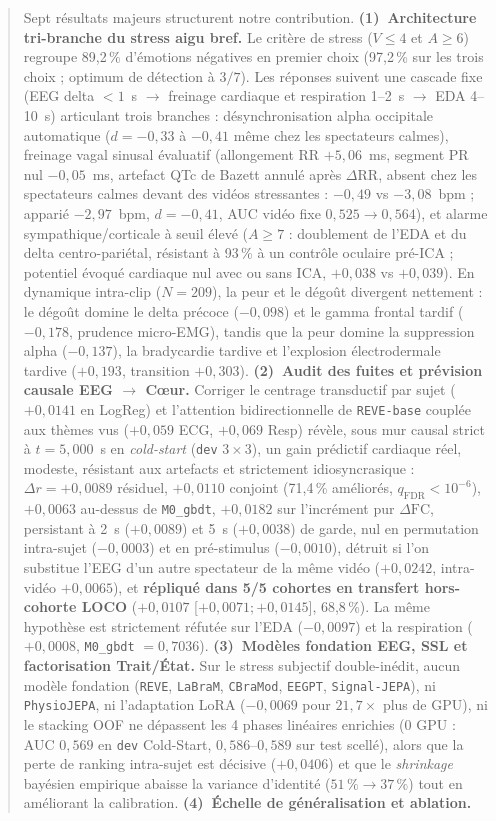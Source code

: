\documentclass[10pt]{article}
\begin{document}
\begin{abstract}
Sept résultats majeurs structurent notre contribution. \textbf{(1)~Architecture tri-branche du stress aigu bref.} Le critère de stress ($V \le 4$ et $A \ge 6$) regroupe 89,2\,\% d'émotions négatives en premier choix (97,2\,\% sur les trois choix ; optimum de détection à $3/7$). Les réponses suivent une cascade fixe (EEG delta $<1$~s $\to$ freinage cardiaque et respiration 1--2~s $\to$ EDA 4--10~s) articulant trois branches : désynchronisation alpha occipitale automatique ($d = -0{,}33$ à $-0{,}41$ même chez les spectateurs calmes), freinage vagal sinusal évaluatif (allongement RR $+5{,}06$~ms, segment PR nul $-0{,}05$~ms, artefact QTc de Bazett annulé après $\Delta\mathrm{RR}$, absent chez les spectateurs calmes devant des vidéos stressantes : $-0{,}49$ vs $-3{,}08$~bpm ; apparié $-2{,}97$~bpm, $d = -0{,}41$, AUC vidéo fixe $0{,}525 \to 0{,}564$), et alarme sympathique/corticale à seuil élevé ($A \ge 7$ : doublement de l'EDA et du delta centro-pariétal, résistant à 93\,\% à un contrôle oculaire pré-ICA ; potentiel évoqué cardiaque nul avec ou sans ICA, $+0{,}038$ vs $+0{,}039$). En dynamique intra-clip ($N = 209$), la peur et le dégoût divergent nettement : le dégoût domine le delta précoce ($-0{,}098$) et le gamma frontal tardif ($-0{,}178$, prudence micro-EMG), tandis que la peur domine la suppression alpha ($-0{,}137$), la bradycardie tardive et l'explosion électrodermale tardive ($+0{,}193$, transition $+0{,}303$). \textbf{(2)~Audit des fuites et prévision causale EEG $\to$ Cœur.} Corriger le centrage transductif par sujet ($+0{,}0141$ en LogReg) et l'attention bidirectionnelle de \texttt{REVE-base} couplée aux thèmes vus ($+0{,}059$ ECG, $+0{,}069$ Resp) révèle, sous mur causal strict à $t = 5{,}000$~s en \emph{cold-start} (\texttt{dev} $3\times 3$), un gain prédictif cardiaque réel, modeste, résistant aux artefacts et strictement idiosyncrasique : $\Delta r = +0{,}0089$ résiduel, $+0{,}0110$ conjoint (71,4\,\% améliorés, $q_{\text{FDR}} < 10^{-6}$), $+0{,}0063$ au-dessus de \texttt{M0\_gbdt}, $+0{,}0182$ sur l'incrément pur $\Delta\mathrm{FC}$, persistant à 2~s ($+0{,}0089$) et 5~s ($+0{,}0038$) de garde, nul en permutation intra-sujet ($-0{,}0003$) et en pré-stimulus ($-0{,}0010$), détruit si l'on substitue l'EEG d'un autre spectateur de la même vidéo ($+0{,}0242$, intra-vidéo $+0{,}0065$), et \textbf{répliqué dans 5/5 cohortes en transfert hors-cohorte LOCO} ($+0{,}0107$ [$+0{,}0071 ; +0{,}0145$], 68,8\,\%). La même hypothèse est strictement réfutée sur l'EDA ($-0{,}0097$) et la respiration ($+0{,}0008$, \texttt{M0\_gbdt} $= 0{,}7036$). \textbf{(3)~Modèles fondation EEG, SSL et factorisation Trait/État.} Sur le stress subjectif double-inédit, aucun modèle fondation (\texttt{REVE}, \texttt{LaBraM}, \texttt{CBraMod}, \texttt{EEGPT}, \texttt{Signal-JEPA}), ni \texttt{PhysioJEPA}, ni l'adaptation LoRA ($-0{,}0069$ pour $21{,}7\times$ plus de GPU), ni le stacking OOF ne dépassent les 4 phases linéaires enrichies (0 GPU : AUC $0{,}569$ en \texttt{dev} Cold-Start, $0{,}586$--$0{,}589$ sur test scellé), alors que la perte de ranking intra-sujet est décisive ($+0{,}0406$) et que le \emph{shrinkage} bayésien empirique abaisse la variance d'identité ($51\,\% \to 37\,\%$) tout en améliorant la calibration. \textbf{(4)~Échelle de généralisation et ablation.} 
\end{abstract}
\end{document}
